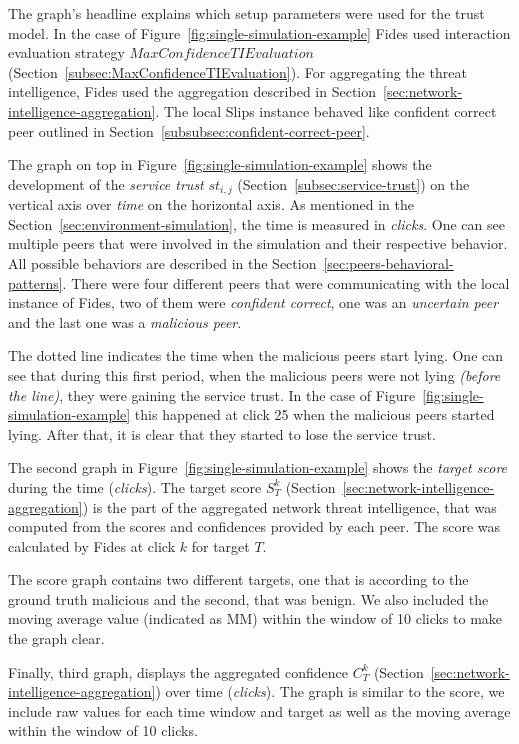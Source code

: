 The graph's headline explains which setup parameters were used for the trust model. In the case of Figure~\ref{fig:single-simulation-example} Fides used interaction evaluation strategy $MaxConfidenceTIEvaluation$ (Section~\ref{subsec:MaxConfidenceTIEvaluation}).
For aggregating the threat intelligence, Fides used the aggregation described in  Section~\ref{sec:network-intelligence-aggregation}.
The local Slips instance behaved like confident correct peer outlined in  Section~\ref{subsubsec:confident-correct-peer}.

The graph on top in Figure~\ref{fig:single-simulation-example} shows the development of the \textit{service trust} $st_{i, j}$ (Section~\ref{subsec:service-trust}) on the vertical axis over \textit{time} on the horizontal axis. As mentioned in the Section~\ref{sec:environment-simulation}, the time is measured in \textit{clicks}.
One can see multiple peers that were involved in the simulation and their respective behavior. All possible behaviors are described in the Section~\ref{sec:peers-behavioral-patterns}.
There were four different peers that were communicating with the local instance of Fides, two of them were \textit{confident correct}, one was an \textit{uncertain peer} and the last one was a \textit{malicious peer}.

The dotted line indicates the time when the malicious peers start lying.
One can see that during this first period, when the malicious peers were not lying \textit{(before the line)}, they were gaining the service trust.
In the case of Figure~\ref{fig:single-simulation-example} this happened at click 25 when the malicious peers started lying.
After that, it is clear that they started to lose the service trust.

The second graph in Figure~\ref{fig:single-simulation-example} shows the \textit{target score} during the time (\textit{clicks}).
The target score $S^{k}_{T}$ (Section~\ref{sec:network-intelligence-aggregation}) is the part of the aggregated network threat intelligence, that was computed from the scores and confidences provided by each peer.
The score was calculated by Fides at click $k$ for target $T$.

The score graph contains two different targets, one that is according to the ground truth malicious and the second, that was benign.
We also included the moving average value (indicated as MM) within the window of 10 clicks to make the graph clear.

Finally, third graph, displays the aggregated confidence $C^{k}_{T}$ (Section~\ref{sec:network-intelligence-aggregation}) over time (\textit{clicks}).
The graph is similar to the score, we include raw values for each time window and target as well as the moving average within the window of 10 clicks.


